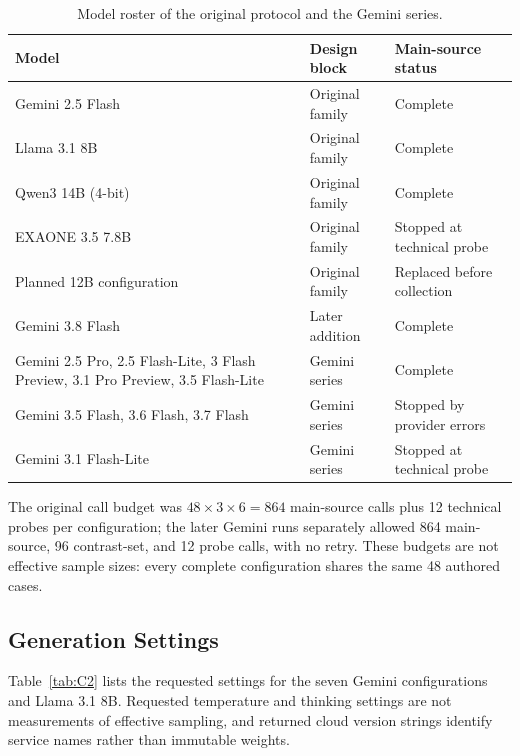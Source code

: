 \documentclass[acmsmall,review]{acmart}
\begin{document}
\begin{table}[H]
\centering
\caption{Model roster of the original protocol and the Gemini series.}\label{tab:C1}
\small
\setlength{\tabcolsep}{4pt}
\begin{tabular}{@{}>{\raggedright\arraybackslash}p{}>{\raggedright\arraybackslash}p{}>{\raggedright\arraybackslash}p{}@{}}
\toprule
\textbf{Model} & \textbf{Design block} & \textbf{Main-source status} \\
\midrule
Gemini 2.5 Flash & Original family & Complete \\
Llama 3.1 8B & Original family & Complete \\
Qwen3 14B (4-bit) & Original family & Complete \\
EXAONE 3.5 7.8B & Original family & Stopped at technical probe \\
Planned 12B configuration & Original family & Replaced before collection \\
Gemini 3.8 Flash & Later addition & Complete \\
Gemini 2.5 Pro, 2.5 Flash-Lite, 3 Flash Preview, 3.1 Pro Preview, 3.5 Flash-Lite & Gemini series & Complete \\
Gemini 3.5 Flash, 3.6 Flash, 3.7 Flash & Gemini series & Stopped by provider errors \\
Gemini 3.1 Flash-Lite & Gemini series & Stopped at technical probe \\
\bottomrule
\end{tabular}
\end{table}

The original call budget was $48\times3\times6=864$ main-source calls plus 12 technical probes per configuration; the later Gemini runs separately allowed 864 main-source, 96 contrast-set, and 12 probe calls, with no retry. These budgets are not effective sample sizes: every complete configuration shares the same 48 authored cases.

\subsection{Generation Settings}
Table~\ref{tab:C2} lists the requested settings for the seven Gemini configurations and Llama 3.1 8B. Requested temperature and thinking settings are not measurements of effective sampling, and returned cloud version strings identify service names rather than immutable weights.
\end{document}
